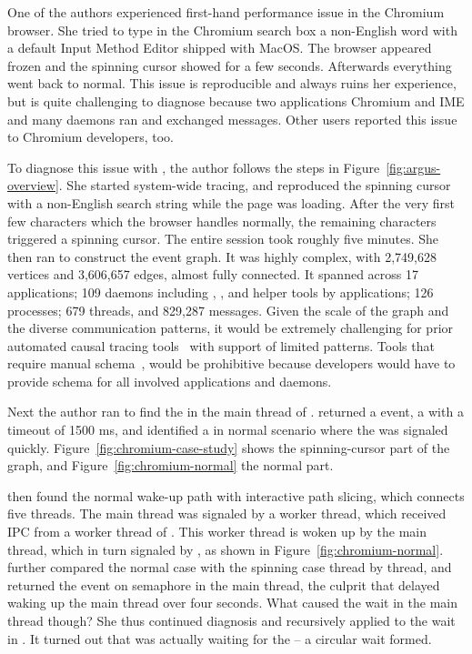 One of the authors experienced first-hand performance issue
in the Chromium browser. She tried to type in
the Chromium search box a non-English word with a default Input Method Editor
shipped with MacOS. The browser appeared frozen and the spinning cursor showed
for a few seconds. Afterwards everything went back to normal. This issue is
reproducible and always ruins her experience, but is quite challenging to
diagnose because two applications Chromium and IME and many daemons ran and
exchanged messages. Other users reported this issue to Chromium developers, too.

To diagnose this issue with \xxx, the author follows the steps in
Figure~\ref{fig:argus-overview}. She started system-wide tracing, and
reproduced the spinning cursor with a non-English search string while the
page was loading. After the very first few characters which the browser
handles normally, the remaining characters triggered a spinning cursor. The
entire session took roughly five minutes. She then ran \xxx to construct
the event graph. It was highly complex, with 2,749,628 vertices and
3,606,657 edges, almost fully connected. It spanned across 17 applications;
109 daemons including , ,  and
helper tools by applications; 126 processes; 679 threads, and 829,287
messages. Given the scale of the graph and the diverse communication patterns,
it would be extremely challenging for prior automated causal tracing
tools~\cite{aguilera2003performance, zhang2013panappticon, attariyan2012x,
cohen2004correlating} with support of limited patterns. Tools
that require manual schema~\cite{barham2004using, reynolds2006pip}, would be
prohibitive because developers would have to provide schema for all involved
applications and daemons.

Next the author ran \xxx to find the \spinningnode in the main thread of .
\xxx returned a  event, a  with a
timeout of 1500 ms, and identified a \similarnode in normal scenario where
the  was signaled quickly.  Figure~\ref{fig:chromium-case-study}
shows the spinning-cursor part of the graph, and
Figure~\ref{fig:chromium-normal} the normal part.

\xxx then found the normal wake-up path with interactive path slicing,
which connects five threads. The  main thread was signaled by
a  worker thread, which received IPC from a worker thread of
. This worker thread is woken up by the  main
thread, which in turn signaled by , as shown in
Figure~\ref{fig:chromium-normal}. \xxx further compared the normal case
with the spinning case thread by thread, and returned the 
event on semaphore in the  main thread, the culprit that
delayed waking up the  main thread over four seconds. What
caused the wait in the  main thread though? She thus
continued diagnosis and recursively applied \xxx to the wait in
.  It turned out that  was actually waiting for
the  -- a circular wait formed.

